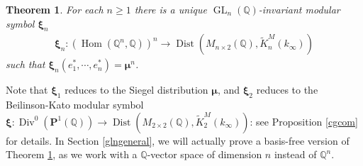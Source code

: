 \documentclass[12pt,amstex,amssymb]{article}
\theoremstyle{plain}
\newtheorem{theorem}{Theorem}[subsection]
\theoremstyle{definition}
\def\Q{{\mathbb Q}}
\def\BP{{\mathbf{P}}}
\newcommand{\bea}{\begin{eqnarray}}
\newcommand{\eea}{\end{eqnarray}}
\newcommand{\GL}{\operatorname{GL}}
\newcommand{\Dist}{\operatorname{Dist}}
\begin{document}
\begin{theorem}\label{glnmodularsymbol}
For each $n \geq 1$ there is a unique $\GL_n(\Q)$-invariant modular symbol ${\bm\xi}_n$
\bea
{\bm\xi}_n: (\operatorname{Hom}(\Q^n,\Q))^n \to \Dist(M_{n\times 2}(\Q), \tilde K^M_n(k_\infty))
\eea
such that ${\bm\xi}_n (e_1^*, \cdots, e_n^*) = {\bm\mu}^n$.
\end{theorem}
Note that ${\bm\xi}_1$ reduces to the Siegel distribution ${\bm\mu}$, and 
${\bm\xi}_2$ reduces to the Beilinson-Kato modular symbol ${\bm\xi}: \operatorname{Div}^0(\BP^1(\Q)) \to \Dist(M_{2\times2}(\Q), \tilde K^M_2(k_\infty))$: see Proposition \ref{cgcom} for details.
In Section \ref{glngeneral}, we will actually prove a basis-free version of Theorem \ref{glnmodularsymbol}, as we work with a $\Q$-vector space of dimension $n$ instead of $\Q^n$.
\end{document}

